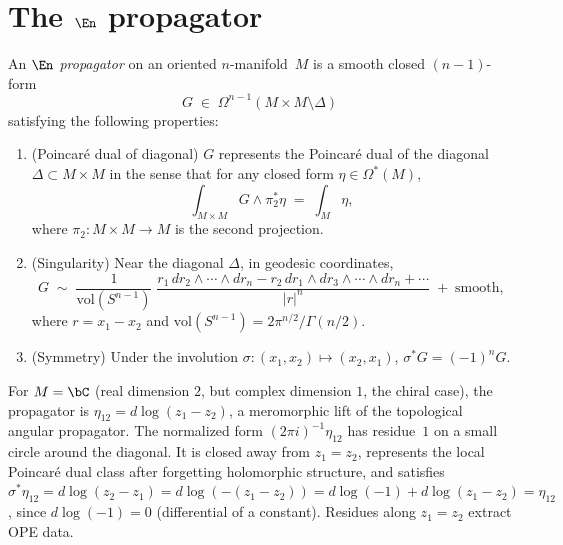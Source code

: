 
\section{\texorpdfstring{The $\En$ propagator}{The En propagator}}
\label{sec:en-propagator}

\begin{definition}
\label{def:en-propagator}
An \emph{$\En$ propagator} on an oriented $n$-manifold~$M$ is a
smooth closed $(n-1)$-form
\[
G \;\in\; \Omega^{n-1}(M \times M \setminus \Delta)
\]
satisfying the following properties:
\begin{enumerate}[label=\textup{(\roman*)}]
\item \textup{(Poincar\'e dual of diagonal)}\quad
 $G$ represents the Poincar\'e dual of the diagonal
 $\Delta \subset M \times M$ in the sense that for any
 closed form $\eta \in \Omega^*(M)$,
 \[
 \int_{M \times M} G \wedge \pi_2^* \eta
 \;=\; \int_M \eta,
 \]
 where $\pi_2\colon M \times M \to M$ is the second projection.
\item \textup{(Singularity)}\quad
 Near the diagonal $\Delta$, in geodesic coordinates,
 \[
 G \;\sim\;
 \frac{1}{\mathrm{vol}(S^{n-1})}\;
 \frac{r_1\, dr_2 \wedge \cdots \wedge dr_n
 - r_2\, dr_1 \wedge dr_3 \wedge \cdots \wedge dr_n
 + \cdots}{|r|^n}
 \;+\; \text{smooth},
 \]
 where $r = x_1 - x_2$ and $\mathrm{vol}(S^{n-1}) = 2\pi^{n/2}/\Gamma(n/2)$.
\item \textup{(Symmetry)}\quad
 Under the involution $\sigma\colon (x_1, x_2) \mapsto (x_2, x_1)$,
 $\sigma^* G = (-1)^n G$.
\end{enumerate}
\end{definition}

\begin{example}[\texorpdfstring{$n = 2$}{n = 2}: the chiral propagator on a complex curve]
\label{ex:n2-chiral-propagator}
For $M = \bC$ (real dimension $2$, but complex dimension $1$, the
chiral case), the propagator is
$\eta_{12} = d\log(z_1 - z_2)$, a meromorphic lift of the
topological angular propagator. The normalized form
$(2\pi i)^{-1}\eta_{12}$ has residue~$1$ on a small circle around
the diagonal. It is closed away from $z_1 = z_2$, represents the
local Poincar\'e dual class after forgetting holomorphic structure,
and satisfies
$\sigma^* \eta_{12} = d\log(z_2 - z_1) = d\log(-(z_1-z_2)) = d\log(-1) + d\log(z_1-z_2) = \eta_{12}$,
since $d\log(-1) = 0$ (differential of a constant). Residues along $z_1 = z_2$ extract OPE data.
\end{example}

